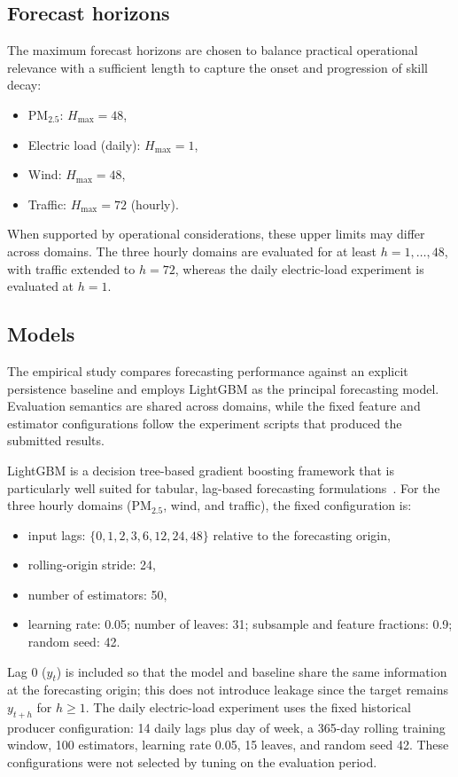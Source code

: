 \documentclass[pdflatex]{sn-jnl}
\begin{document}
\subsection{Forecast horizons}

The maximum forecast horizons are chosen to balance practical
operational relevance with a sufficient length to capture the onset and
progression of skill decay:
\begin{itemize}
  \item PM$_{2.5}$: $H_{\max}=48$,
  \item Electric load (daily): $H_{\max}=1$,
  \item Wind: $H_{\max}=48$,
  \item Traffic: $H_{\max}=72$ (hourly).
\end{itemize}
When supported by operational considerations, these upper limits may
differ across domains. The three hourly domains are evaluated for at least
$h=1,\ldots,48$, with traffic extended to $h=72$, whereas the daily
electric-load experiment is evaluated at $h=1$.

\subsection{Models}

The empirical study compares forecasting performance against an
explicit persistence baseline and employs LightGBM as the principal
forecasting model. Evaluation semantics are shared across domains, while
the fixed feature and estimator configurations follow the experiment
scripts that produced the submitted results.

LightGBM is a decision tree-based gradient boosting framework that is
particularly well suited for tabular, lag-based forecasting
formulations~\citep{ke2017lightgbm}. For the three hourly domains
(PM$_{2.5}$, wind, and traffic), the fixed configuration is:
\begin{itemize}
  \item input lags: $\{0,1,2,3,6,12,24,48\}$ relative to the forecasting origin,
  \item rolling-origin stride: 24,
  \item number of estimators: 50,
  \item learning rate: 0.05; number of leaves: 31; subsample and feature
  fractions: 0.9; random seed: 42.
\end{itemize}
Lag 0 ($y_t$) is included so that the model and baseline share the same
information at the forecasting origin; this does not introduce leakage
since the target remains $y_{t+h}$ for $h \geq 1$.
The daily electric-load experiment uses the fixed historical producer
configuration: 14 daily lags plus day of week, a 365-day rolling training
window, 100 estimators, learning rate 0.05, 15 leaves, and random seed 42.
These configurations were not selected by tuning on the evaluation period.
\end{document}
